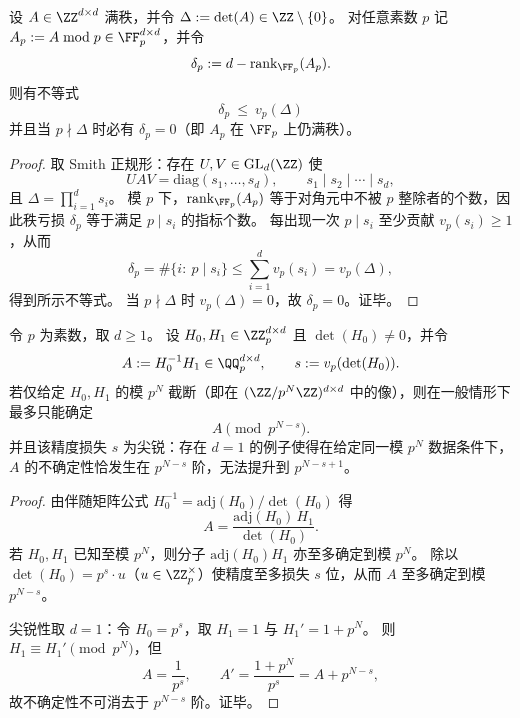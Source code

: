 \begin{proposition}\label{prop:xi-det-vp-controls-rank-drop}
设 \(A\in\ZZ^{d\times d}\) 满秩，并令 \(\Delta:=\det(A)\in\ZZ\setminus\{0\}\)。
对任意素数 \(p\) 记 \(A_p:=A\bmod p\in \FF_p^{d\times d}\)，并令
\[
\delta_p:=d-\mathrm{rank}_{\FF_p}(A_p).
\]
则有不等式
\[
\boxed{\;\delta_p\ \le\ v_p(\Delta)\;}
\]
并且当 \(p\nmid \Delta\) 时必有 \(\delta_p=0\)（即 \(A_p\) 在 \(\FF_p\) 上仍满秩）。
\end{proposition}
\begin{proof}
取 Smith 正规形：存在 \(U,V\in\mathrm{GL}_d(\ZZ)\) 使
\[
UAV=\mathrm{diag}(s_1,\dots,s_d),\qquad s_1\mid s_2\mid\cdots\mid s_d,
\]
且 \(\Delta=\prod_{i=1}^{d}s_i\)。
模 \(p\) 下，\(\mathrm{rank}_{\FF_p}(A_p)\) 等于对角元中不被 \(p\) 整除者的个数，因此秩亏损 \(\delta_p\) 等于满足 \(p\mid s_i\) 的指标个数。
每出现一次 \(p\mid s_i\) 至少贡献 \(v_p(s_i)\ge 1\)，从而
\[
\delta_p=\#\{i:\ p\mid s_i\}\le \sum_{i=1}^{d} v_p(s_i)=v_p(\Delta),
\]
得到所示不等式。
当 \(p\nmid\Delta\) 时 \(v_p(\Delta)=0\)，故 \(\delta_p=0\)。证毕。
\end{proof}

\begin{proposition}\label{prop:xi-hankel-padics-precision-loss-detH0}
令 \(p\) 为素数，取 \(d\ge 1\)。
设 \(H_0,H_1\in \ZZ_{p}^{d\times d}\) 且 \(\det(H_0)\neq 0\)，并令
\[
A:=H_0^{-1}H_1\in \QQ_{p}^{d\times d},
\qquad
s:=v_p(\det(H_0)).
\]
若仅给定 \(H_0,H_1\) 的模 \(p^N\) 截断（即在 \((\ZZ/p^N\ZZ)^{d\times d}\) 中的像），则在一般情形下最多只能确定
\[
A\pmod{p^{N-s}}.
\]
并且该精度损失 \(s\) 为尖锐：存在 \(d=1\) 的例子使得在给定同一模 \(p^N\) 数据条件下，\(A\) 的不确定性恰发生在 \(p^{N-s}\) 阶，无法提升到 \(p^{N-s+1}\)。
\end{proposition}
\begin{proof}
由伴随矩阵公式 \(H_0^{-1}=\mathrm{adj}(H_0)/\det(H_0)\) 得
\[
A=\frac{\mathrm{adj}(H_0)\,H_1}{\det(H_0)}.
\]
若 \(H_0,H_1\) 已知至模 \(p^N\)，则分子 \(\mathrm{adj}(H_0)H_1\) 亦至多确定到模 \(p^N\)。
除以 \(\det(H_0)=p^s\cdot u\)（\(u\in\ZZ_p^\times\)）使精度至多损失 \(s\) 位，从而 \(A\) 至多确定到模 \(p^{N-s}\)。
\par
尖锐性取 \(d=1\)：令 \(H_0=p^s\)，取 \(H_1=1\) 与 \(H_1'=1+p^N\)。
则 \(H_1\equiv H_1'\pmod{p^N}\)，但
\[
A=\frac{1}{p^s},\qquad
A'=\frac{1+p^N}{p^s}=A+p^{N-s},
\]
故不确定性不可消去于 \(p^{N-s}\) 阶。证毕。
\end{proof}

